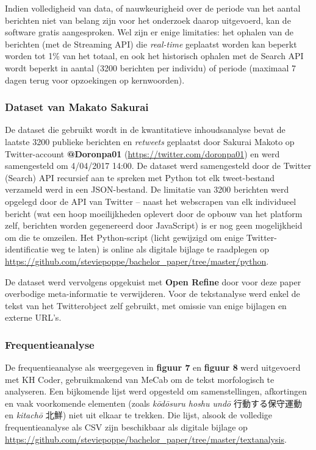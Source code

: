 \documentclass[10.5pt,dutch,]{article}
\begin{document}
Indien volledigheid van data, of nauwkeurigheid over de periode van het
aantal berichten niet van belang zijn voor het onderzoek daarop
uitgevoerd, kan de software gratis aangesproken. Wel zijn er enige
limitaties: het ophalen van de berichten (met de Streaming API) die
\emph{real-time} geplaatst worden kan beperkt worden tot 1\% van het
totaal, en ook het historisch ophalen met de Search API wordt beperkt in
aantal (3200 berichten per individu) of periode (maximaal 7 dagen terug
voor opzoekingen op kernwoorden).

\subsubsection{Dataset van Makato
Sakurai}\label{dataset-van-makato-sakurai}

De dataset die gebruikt wordt in de kwantitatieve inhoudsanalyse bevat
de laatste 3200 publieke berichten en \emph{retweets} geplaatst door
Sakurai Makoto op Twitter-account \textbf{@Doronpa01}
(\url{https://twitter.com/doronpa01}) en werd samengesteld om 4/04/2017
14:00. De dataset werd samengesteld door de Twitter (Search) API
recursief aan te spreken met Python tot elk tweet-bestand verzameld werd
in een JSON-bestand. De limitatie van 3200 berichten werd opgelegd door
de API van Twitter -- naast het webscrapen van elk individueel bericht
(wat een hoop moeilijkheden oplevert door de opbouw van het platform
zelf, berichten worden gegenereerd door JavaScript) is er nog geen
mogelijkheid om die te omzeilen. Het Python-script (licht gewijzigd om
enige Twitter-identificatie weg te laten) is online als digitale bijlage
te raadplegen op
\url{https://github.com/steviepoppe/bachelor_paper/tree/master/python}.

De dataset werd vervolgens opgekuist met \textbf{Open Refine} door voor
deze paper overbodige meta-informatie te verwijderen. Voor de
tekstanalyse werd enkel de tekst van het Twitterobject zelf gebruikt,
met omissie van enige bijlagen en externe URL's.

\subsubsection{Frequentieanalyse}\label{frequentieanalyse}

De frequentieanalyse als weergegeven in \textbf{figuur 7} en
\textbf{figuur 8} werd uitgevoerd met KH Coder, gebruikmakend van MeCab
om de tekst morfologisch te analyseren. Een bijkomende lijst werd
opgesteld om samenstellingen, afkortingen en vaak voorkomende elementen
(zoals \emph{kōdōsuru hoshu undō} 行動する保守運動 en \emph{kitachō}
北鮮) niet uit elkaar te trekken. Die lijst, alsook de volledige
frequentieanalyse als CSV zijn beschikbaar als digitale bijlage op
\url{https://github.com/steviepoppe/bachelor_paper/tree/master/textanalysis}.
\end{document}
